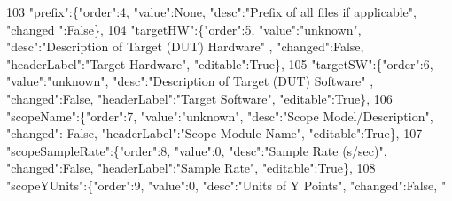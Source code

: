 \begin{DoxyCode}
103                     \textcolor{stringliteral}{"prefix"}:\{\textcolor{stringliteral}{"order"}:4, \textcolor{stringliteral}{"value"}:\textcolor{keywordtype}{None}, \textcolor{stringliteral}{"desc"}:\textcolor{stringliteral}{"Prefix of all files if applicable"}, \textcolor{stringliteral}{"changed
      "}:\textcolor{keyword}{False}\},
104                     \textcolor{stringliteral}{"targetHW"}:\{\textcolor{stringliteral}{"order"}:5, \textcolor{stringliteral}{"value"}:\textcolor{stringliteral}{"unknown"}, \textcolor{stringliteral}{"desc"}:\textcolor{stringliteral}{"Description of Target (DUT) Hardware"}
      , \textcolor{stringliteral}{"changed"}:\textcolor{keyword}{False}, \textcolor{stringliteral}{"headerLabel"}:\textcolor{stringliteral}{"Target Hardware"}, \textcolor{stringliteral}{"editable"}:\textcolor{keyword}{True}\},
105                     \textcolor{stringliteral}{"targetSW"}:\{\textcolor{stringliteral}{"order"}:6, \textcolor{stringliteral}{"value"}:\textcolor{stringliteral}{"unknown"}, \textcolor{stringliteral}{"desc"}:\textcolor{stringliteral}{"Description of Target (DUT) Software"}
      , \textcolor{stringliteral}{"changed"}:\textcolor{keyword}{False}, \textcolor{stringliteral}{"headerLabel"}:\textcolor{stringliteral}{"Target Software"}, \textcolor{stringliteral}{"editable"}:\textcolor{keyword}{True}\},
106                     \textcolor{stringliteral}{"scopeName"}:\{\textcolor{stringliteral}{"order"}:7, \textcolor{stringliteral}{"value"}:\textcolor{stringliteral}{"unknown"}, \textcolor{stringliteral}{"desc"}:\textcolor{stringliteral}{"Scope Model/Description"}, \textcolor{stringliteral}{"changed"}:\textcolor{keyword}{
      False}, \textcolor{stringliteral}{"headerLabel"}:\textcolor{stringliteral}{"Scope Module Name"}, \textcolor{stringliteral}{"editable"}:\textcolor{keyword}{True}\},
107                     \textcolor{stringliteral}{"scopeSampleRate"}:\{\textcolor{stringliteral}{"order"}:8, \textcolor{stringliteral}{"value"}:0, \textcolor{stringliteral}{"desc"}:\textcolor{stringliteral}{"Sample Rate (s/sec)"}, \textcolor{stringliteral}{"changed"}:\textcolor{keyword}{False},
       \textcolor{stringliteral}{"headerLabel"}:\textcolor{stringliteral}{"Sample Rate"}, \textcolor{stringliteral}{"editable"}:\textcolor{keyword}{True}\},
108                     \textcolor{stringliteral}{"scopeYUnits"}:\{\textcolor{stringliteral}{"order"}:9, \textcolor{stringliteral}{"value"}:0, \textcolor{stringliteral}{"desc"}:\textcolor{stringliteral}{"Units of Y Points"}, \textcolor{stringliteral}{"changed"}:\textcolor{keyword}{False}, \textcolor{stringliteral}{"
}
\end{DoxyCode}

